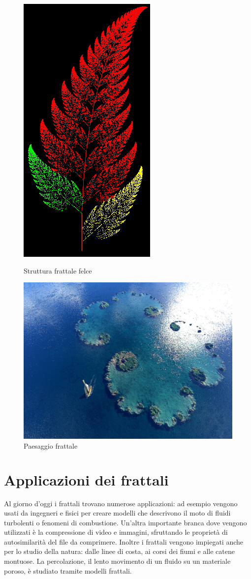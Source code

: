\documentclass[10pt]{report}
\begin{document}
			\begin{figure}[H]
				\centering
				\includegraphics[width=0.3\linewidth, height=0.2\textheight]{"Frattali in natura/felcebarnsley"}
				
				\caption*{Struttura frattale felce}
				\label{fig:felce}
				\endminipage \hfill
				\centering
				\includegraphics[width=0.7\linewidth]{"Frattali in natura/paesaggio_frattale"}
				\caption*{Paesaggio frattale}
				\label{fig:paesaggio}
				\endminipage \hfill
			\end{figure}

		\section{Applicazioni dei frattali}
			Al giorno d'oggi i frattali trovano numerose applicazioni: ad esempio vengono usati da ingegneri e fisici per creare modelli che descrivono il moto di fluidi turbolenti o fenomeni di combustione. Un'altra importante branca dove vengono utilizzati è la compressione di video e immagini, sfruttando le proprietà di autosimilarità del file da comprimere. Inoltre i frattali vengono impiegati anche per lo studio della natura: dalle linee di costa, ai corsi dei fiumi e alle catene montuose. La percolazione, il lento movimento di un fluido su un materiale poroso, è studiato tramite modelli frattali.
\end{document}
